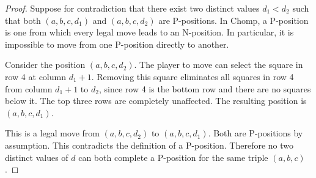 \documentclass[10pt,a4paper]{amsart}
\begin{document}
\begin{proof}
Suppose for contradiction that there exist two distinct values
$d_1 < d_2$ such that both $(a, b, c, d_1)$ and $(a, b, c, d_2)$
are P-positions. In Chomp, a P-position is one from which every
legal move leads to an N-position. In particular, it is impossible
to move from one P-position directly to another.

Consider the position $(a, b, c, d_2)$. The player to move can
select the square in row 4 at column $d_1 + 1$. Removing this square
eliminates all squares in row 4 from column $d_1 + 1$ to $d_2$,
since row 4 is the bottom row and there are no squares below it.
The top three rows are completely unaffected. The resulting position
is $(a, b, c, d_1)$.

This is a legal move from $(a, b, c, d_2)$ to $(a, b, c, d_1)$.
Both are P-positions by assumption. This contradicts the definition
of a P-position. Therefore no two distinct values of $d$ can both
complete a P-position for the same triple $(a, b, c)$.
\end{proof}
\end{document}
